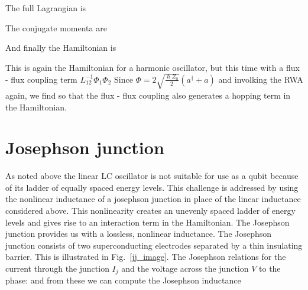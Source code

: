
The full Lagrangian is

The conjugate momenta are

And finally the Hamiltonian is

This is again the Hamiltonian for a harmonic oscillator, but this time with a flux - flux coupling term $L^{-1}_{12} \Phi_1 \Phi_2$
Since $\Phi = 2 \sqrt{\frac{\hslash Z_0}{2}}(a^{\dagger} + a)$ and involking the RWA again, we find
so that the flux - flux coupling also generates a hopping term in the Hamiltonian.


\section{Josephson junction}
As noted above the linear LC oscillator is not suitable for use as a qubit because of its ladder of equally spaced energy levels.
This challenge is addressed by using the nonlinear inductance of a josephson junction in place of the linear inductance considered above.
This nonlinearity creates an unevenly spaced ladder of energy levels and gives rise to an interaction term in the Hamiltonian.
The Josephson junction provides us with a lossless, nonlinear inductance.\cite{Josephson1962}
The Josephson junction consists of two superconducting electrodes separated by a thin insulating barrier.
This is illustrated in Fig.~\ref{jj_image}.
\draftcomment{We follow a derivation due to Van Duzer, cite Josephson
In 1962 Brian Josephson derived the following relations for (TODO: Cooper pair tunneling accross the junction)
Nobel 1973
}%
The Josephson relations for the current through the junction $I_j$ and the voltage across the junction $V$ to the phase:
and
from these we can compute the Josephson inductance


